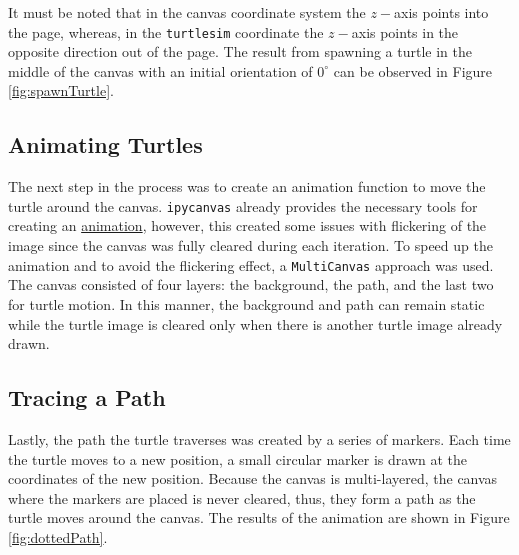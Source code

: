        
        \noindent It must be noted that in the canvas coordinate system the $z-$axis points into the page, whereas, in the \texttt{turtlesim} coordinate the $z-$axis points in the opposite direction out of the page. The result from spawning a turtle in the middle of the canvas with an initial orientation of $0^\circ$ can be observed in Figure \ref{fig:spawnTurtle}.
    

    
    \subsection{Animating Turtles}
    
        The next step in the process was to create an animation function to move the turtle around the canvas. \texttt{ipycanvas} already provides the necessary tools for creating an \href{https://ipycanvas.readthedocs.io/en/latest/animations.html}{animation}, however, this created some issues with flickering of the image since the canvas was fully cleared during each iteration. To speed up the animation and to avoid the flickering effect, a \texttt{MultiCanvas} approach was used. The canvas consisted of four layers: the background, the path, and the last two for turtle motion. In this manner, the background and path can remain static while the turtle image is cleared only when there is another turtle image already drawn.
    
    \subsection{Tracing a Path}
    
        Lastly, the path the turtle traverses was created by a series of markers. Each time the turtle moves to a new position, a small circular marker is drawn at the coordinates of the new position. Because the canvas is multi-layered, the canvas where the markers are placed is never cleared, thus, they form a path as the turtle moves around the canvas. The results of the animation are shown in Figure \ref{fig:dottedPath}.
    
